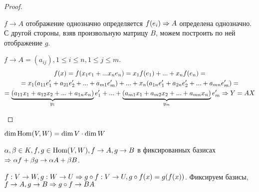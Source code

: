 \begin{proof}
	\begin{MyList}
		\item $f \to A$ отображение однозначно определяется $f(e_i) \Rightarrow A$ определена однозначно.
		С другой стороны, взяв произвольную матрицу $B$, можем построить по ней отображение $g$.

		\item $f \to A = (a_{ij}), 1 \leqslant i \leqslant n, 1 \leqslant j \leqslant m$.
		\begin{gather*}
			f(x) = f(x_1 e_1 + ... x_n e_n) = x_1 f(e_1) + ... + x_n f(e_n) = \\
			= x_1 (a_{11} e_1' + a_{21} e_2' + ... + a_{m1} e_m') + ... + x_n (a_{1n} e_1' + a_{2n} e_2' + ... + a_{mn} e_m') = \\
			= \underbrace{(a_{11} x_1 + a_{12} x_2 + ... + a_{1n} x_n)}_{y_1} e_1' + ... + \underbrace{(a_{m1} x_1 + a_{m2} x_2 + ... + a_{mn} x_n)}_{y_m} e_m' \Rightarrow Y = AX
		\end{gather*}
	\end{MyList}
\end{proof}

\begin{Cons}
	\begin{MyList}
		\item $\dim \operatorname{Hom}(V, W) = \dim V \cdot \dim W$
		\item $\alpha, \beta \in K, f, g \in \operatorname{Hom}(V, W), f \to A, g \to B$ в фиксированных базисах $\Rightarrow \alpha f + \beta g \to \alpha A + \beta B$.
		\item $f : V \to W, g : W \to U \Rightarrow g \circ f : V \to U, g \circ f(x) = g(f(x))$.
		Фиксируем базисы, $f \to A, g \to B \Rightarrow g \circ f \to BA$  
	\end{MyList}
\end{Cons}

